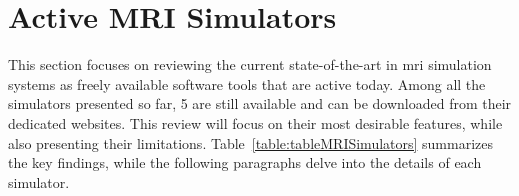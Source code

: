 \section{Active MRI Simulators}
\label{chapterlabel2secMRISIMULATORS}

This section focuses on reviewing the current state-of-the-art in \ac{mri} simulation systems as freely available software tools that are active today.
Among all the simulators presented so far, 5 are still available and can be downloaded from their dedicated websites.
This review will focus on their most desirable features, while also presenting their limitations.
Table~\ref{table:tableMRISimulators} summarizes the key findings, while the following paragraphs delve into the details of each simulator.

\hfill


